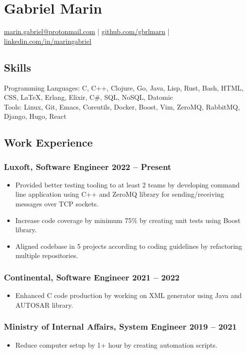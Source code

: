 \documentclass[a4paper,12pt]{article}
\date{}
\title{}
\begin{document}
\section*{\textbf{Gabriel Marin}}
\label{sec:orgcd2ec71}
\begin{center}
\href{mailto:marin.gabriel@protonmail.com}{marin.gabriel@protonmail.com} |
\href{https://github.com/gbrlmarn}{github.com/gbrlmarn} |
\href{https://linkedin.com/in/maringabriel}{linkedin.com/in/maringabriel}
\end{center}
\subsection*{\textbf{Skills}}
\label{sec:org5864239}
Programming Languages: C, C++, Clojure, Go, Java, Lisp, Rust,
Bash, HTML, CSS, \LaTeX{}, Erlang, Elixir, C\#, SQL, NoSQL, Datomic\\
Tools: Linux, Git, Emacs, Coreutils, Docker, Boost, Vim, ZeroMQ,
RabbitMQ, Django, Hugo, React
\subsection*{\textbf{Work Experience}}
\label{sec:orgfbc9872}
\subsubsection*{\textbf{Luxoft}, Software Engineer \hfill 2022 -- Present}
\label{sec:org75fbe5c}
\begin{itemize}
\item Provided better testing tooling to at least 2 teams by developing command line
application using C++ and ZeroMQ library for sending/receiving messages over TCP sockets.
\item Increase code coverage by minimum 75\% by creating unit tests using Boost library.
\item Aligned codebase in 5 projects according to coding guidelines
by refactoring multiple repositories.
\end{itemize}
\subsubsection*{\textbf{Continental}, Software Engineer \hfill 2021 -- 2022}
\label{sec:orgdca294b}
\begin{itemize}
\item Enhanced C code production by working on XML generator using Java and AUTOSAR library.
\end{itemize}
\subsubsection*{\textbf{Ministry of Internal Affairs}, System Engineer \hfill 2019 -- 2021}
\label{sec:org987e76d}
\begin{itemize}
\item Reduce computer setup by 1+ hour by creating automation scripts.
\end{itemize}
\end{document}

